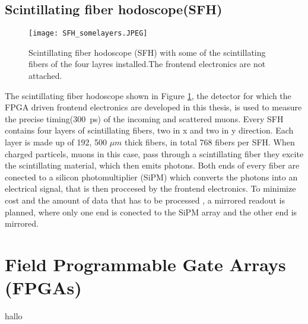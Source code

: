 \subsection{Scintillating fiber hodoscope(SFH)}
\begin{figure}[H]
	\centering
	\texttt{[image: SFH\_somelayers.JPEG]}
	\caption{Scintillating fiber hodoscope (SFH) with some of the scintillating fibers of the four layres installed.The frontend electronics are not attached.\autocite{InternalcommunicationKarl}}
	\label{SFHpicture}
\end{figure}
The scintillating fiber hodoscope shown in Figure \ref{SFHpicture}, 
the detector for which the FPGA driven frontend electronics are developed in this thesis,
is used to measure the precise timing(\SI{300}{\pico\second}\Autocite{Amber2022Status}) of the incoming and scattered muons. 
Every SFH contains four layers of scintillating fibers, two in x and two in y direction.
Each layer is made up of 192\autocite{Amber2022Status}, 500 $\mu m$ thick\autocite{Amber2024Status} fibers, in total 768\autocite{Amber2022Status} fibers per SFH. 
When charged particels, muons in this case, pass through a scintillating fiber they excite the scintillating material, 
which then emits photons. Both ends of every fiber are conected to a silicon photomultiplier (SiPM) which converts the photons into an electrical signal,
 that is then proccesed by the frontend electronics. To minimize cost and the amount of data that has to be processed , a mirrored readout is planned, 
 where only one end is conected to the SiPM array and the other end is mirrored. \autocite{InternalcommunicationKarl}

\section{Field Programmable Gate Arrays (FPGAs)}\label{sec:FPGA}
hallo 

